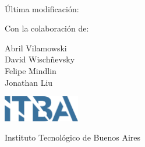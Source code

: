
\begin{titlepage}
\thispagestyle{empty}

\begin{center}
    \vspace*{1cm}
    
    \Huge
    \textbf{\thetitle}
    
    \vspace{0.25cm}
    \large
    \codigomateria \\
    \vspace{0.25cm}
    \Large
    \cuatrimestre

    \vspace{0.25cm}
    \tiny
    Última modificación: \thedate

    
    \vspace{1.5cm}
    
    \normalsize
    \textbf{\theauthor}

    \medskip

    Con la colaboración de:

    Abril Vilamowski%
    \\%
    David Wischñevsky%
    \\%
    Felipe Mindlin%
    \\%
    Jonathan Liu%
    
    \vfill
    
    \vspace{0.8cm}
    \includegraphics[width=0.25\textwidth]{itba_logo.png}
    
    \vspace{0.8cm}
    
    Instituto Tecnológico de Buenos Aires\\
    
    
\end{center}

\end{titlepage}

\restoregeometry %
